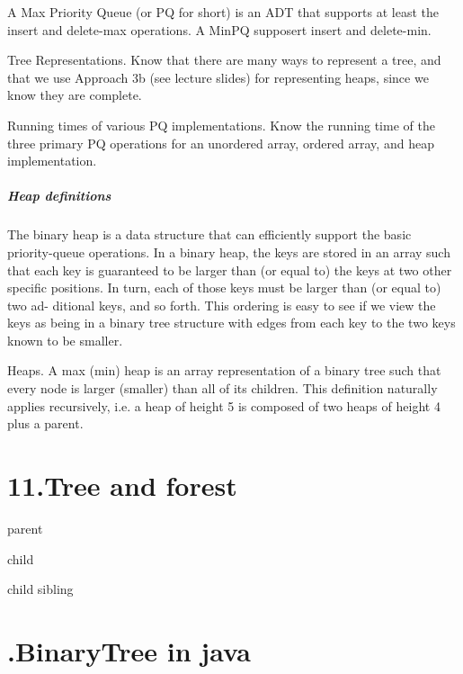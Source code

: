 \documentclass[UTF8]{ctexart}
\begin{document}
A Max Priority Queue (or PQ for short) is an ADT that supports at least the insert and delete-max operations. A MinPQ supposert insert and delete-min.

Tree Representations. Know that there are many ways to represent a tree, and that we use Approach 3b (see lecture slides) for representing heaps, since we know they are complete.

Running times of various PQ implementations. Know the running time of the three primary PQ operations for an unordered array, ordered array, and heap implementation.

\subparagraph{Heap definitions}

The binary heap is a data structure that can efficiently support the basic priority-queue operations. 
In a binary heap, the keys are stored in an array such that each key is guaranteed to be larger than 
(or equal to) the keys at two other specific positions. 
In turn, each of those keys must be larger than (or equal to) two ad- ditional keys, and so forth. 
This ordering is easy to see if we view the keys as being in a binary tree structure 
with edges from each key to the two keys known to be smaller.

Heaps. A max (min) heap is an array representation of a binary tree such that every node is larger (smaller) than all of its children. This definition naturally applies recursively, i.e. a heap of height 5 is composed of two heaps of height 4 plus a parent.




\newpage
\section*{11.Tree and forest}


parent 

child 

child sibling



\newpage
\section*{.BinaryTree in java}

\end{document}
